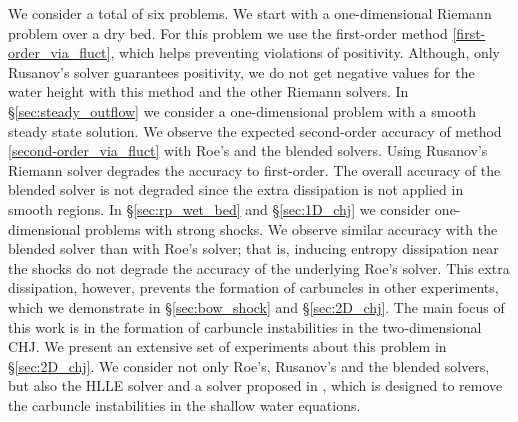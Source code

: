 \documentclass[preprint, 11pt]{article}
\begin{document}
We consider a total of six problems. We start with a one-dimensional Riemann problem over a dry bed.
For this problem we use the first-order method \eqref{first-order_via_fluct},
which helps preventing violations of positivity. Although, only Rusanov's solver guarantees
positivity, we do not get negative values for the water height with this method and the other Riemann solvers.
In \S \ref{sec:steady_outflow} we consider a one-dimensional problem with a smooth steady state solution. We observe the expected
second-order accuracy of method \eqref{second-order_via_fluct} with Roe's and the blended solvers. Using
Rusanov's Riemann solver degrades the accuracy to first-order. The overall accuracy of the blended solver
is not degraded since the extra dissipation is not applied in smooth regions.
In \S\ref{sec:rp_wet_bed} and \S\ref{sec:1D_chj} we consider one-dimensional problems with strong shocks. We observe similar accuracy with the
blended solver than with Roe's solver; that is, inducing entropy dissipation near the shocks do not degrade the accuracy
of the underlying Roe's solver. This extra dissipation, however, prevents the formation of carbuncles in other experiments,
which we demonstrate in \S \ref{sec:bow_shock} and \S\ref{sec:2D_chj}.
The main focus of this work is in the formation of carbuncle instabilities in the two-dimensional CHJ. We present
an extensive set of experiments about this problem in \S \ref{sec:2D_chj}.
We consider not only Roe's, Rusanov's and the blended solvers, but also the HLLE solver and a solver proposed in \cite{kemm2014note},
which is designed to remove the carbuncle instabilities in the shallow water equations.
\end{document}
